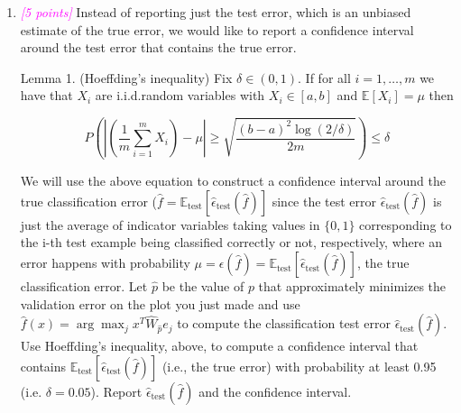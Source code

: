 \documentclass{article}
\newcommand{\argmax}{\arg\!\max}
\newcommand{\1}{\mathbf{1}}
\newcommand{\E}{\mathbb{E}}
\newcommand{\points}[1]{\small\textcolor{magenta}{\emph{[#1 points]}} \normalsize}
\begin{document}
\begin{enumerate}
    \item \points{5} Instead of reporting just the test error, which is an unbiased estimate of the true error, we would like to report a confidence interval around the test error that contains the true error. 
    
    Lemma 1. (Hoeffding’s inequality) Fix $\delta\in (0,1)$. If for all $i=1,\hdots,m$ we have that $X_i$ are i.i.d.random variables with $X_i\in [a,b]$ and $\E[X_i]=\mu$ then
    
    $$P\left(\left| \left(\frac{1}{m}\sum_{i=1}^m X_i\right) - \mu\right| \geq \sqrt{\frac{(b-a)^2 \log(2/\delta)}{2m}} \right) \leq \delta$$
    
    We will use the above equation to construct a confidence interval around the true classification error ($\hat f=\E_\text{test}[\widehat\epsilon_\text{test}(\hat f)]$ since the test error $\widehat\epsilon_\text{test}(\hat f)$ is just the average of indicator variables taking values in $\{0,1\}$ corresponding to the i-th test example being classified correctly or not, respectively, where an error happens with probability $\mu=\epsilon(\hat f)=\E_\text{test}[\widehat\epsilon_\text{test}(\hat f)]$, the true classification error. Let $\hat p$ be the value of $p$ that approximately minimizes the validation error on the plot you just made and use $\hat f(x) = \argmax_j x^T\widehat W_{\hat p} e_j$ to compute the classification test error $\widehat\epsilon_\text{test}(\hat f)$. Use Hoeffding’s inequality, above, to compute a confidence interval that contains $\E_\text{test}[\widehat\epsilon_\text{test}(\hat f)]$ (i.e., the true error) with probability at least 0.95 (i.e. $\delta=0.05$). Report $\widehat\epsilon_\text{test}(\hat f)$ and the confidence interval.

 
\end{enumerate}
\end{document}
